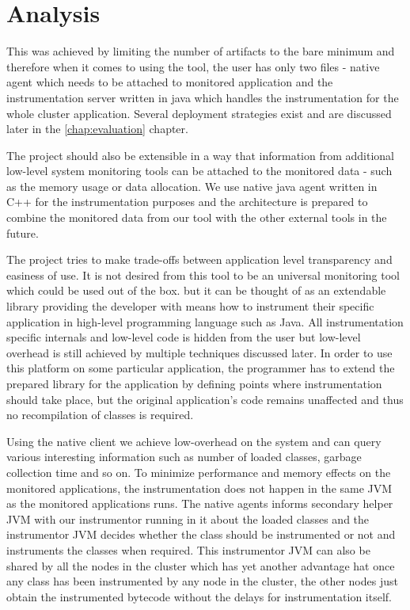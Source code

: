 \chapter{Analysis}
\label{analysis}
This was achieved by limiting the number of artifacts to the bare minimum and therefore when it comes to using the tool, the user has only two files - native agent which needs to be attached to monitored application and the instrumentation server written in java which handles the instrumentation for the whole cluster application. Several deployment strategies exist and are discussed later in the \ref{chap:evaluation} chapter.

The project should also be extensible in a way that information from additional low-level system monitoring tools can be attached to the monitored data - such as the memory usage or data allocation. We use native java agent written in C++ for the instrumentation purposes and the architecture is prepared to combine the monitored data from our tool with the other external tools in the future.  

The project tries to make trade-offs between application level transparency and easiness of use. It is not desired from this tool to be an universal monitoring tool which could be used out of the box. but it can be thought of as an extendable library providing the developer with means how to instrument their specific application in high-level programming language such as Java. All instrumentation specific internals and low-level code is hidden from the user but low-level overhead is still achieved by multiple techniques discussed later. In order to use this platform on some particular application, the programmer has to extend the prepared library for the application by defining points where instrumentation should take place, but the original application's code remains unaffected and thus no recompilation of classes is required.


Using the native client we achieve low-overhead on the system and can query various interesting information such as number of loaded classes, garbage collection time and so on. To minimize performance and memory effects on the monitored applications, the instrumentation does not happen in the same JVM as the monitored applications runs. The native agents informs secondary helper JVM with our instrumentor running in it about the loaded classes and the instrumentor JVM decides whether the class should be instrumented or not and instruments the classes when required. This instrumentor JVM can also be shared by all the nodes in the cluster which has yet another advantage hat once any class has been instrumented by any node in the cluster, the other nodes just obtain the instrumented bytecode without the delays for instrumentation itself.


